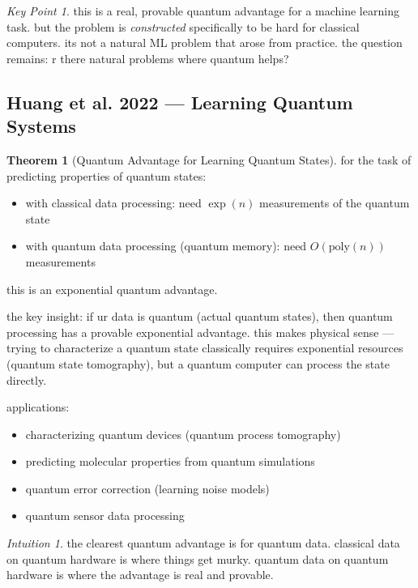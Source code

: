 \documentclass[11pt,a4paper]{article}
\theoremstyle{definition}
\newtheorem{theorem}{Theorem}[section]
\theoremstyle{remark}
\newtheorem*{intuition}{Intuition}
\newtheorem*{keypoint}{Key Point}
\begin{document}
\begin{keypoint}
this is a real, provable quantum advantage for a machine learning task. but the problem is \emph{constructed} specifically to be hard for classical computers. its not a natural ML problem that arose from practice. the question remains: r there natural problems where quantum helps?
\end{keypoint}

\subsection{Huang et al. 2022 --- Learning Quantum Systems}

\begin{theorem}[Quantum Advantage for Learning Quantum States]
for the task of predicting properties of quantum states:
\begin{itemize}[nosep]
    \item with classical data processing: need $\exp(n)$ measurements of the quantum state
    \item with quantum data processing (quantum memory): need $O(\text{poly}(n))$ measurements
\end{itemize}
this is an exponential quantum advantage.
\end{theorem}

the key insight: if ur data is quantum (actual quantum states), then quantum processing has a provable exponential advantage. this makes physical sense --- trying to characterize a quantum state classically requires exponential resources (quantum state tomography), but a quantum computer can process the state directly.

applications:
\begin{itemize}[nosep]
    \item characterizing quantum devices (quantum process tomography)
    \item predicting molecular properties from quantum simulations
    \item quantum error correction (learning noise models)
    \item quantum sensor data processing
\end{itemize}

\begin{intuition}
the clearest quantum advantage is for quantum data. classical data on quantum hardware is where things get murky. quantum data on quantum hardware is where the advantage is real and provable.
\end{intuition}
\end{document}
